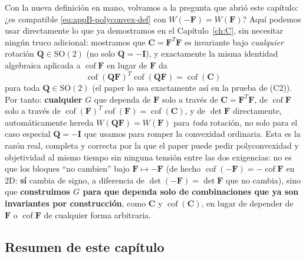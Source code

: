 \documentclass[11pt,a4paper]{article}
\newcommand{\Cof}{\operatorname{cof}}
\begin{document}
Con la nueva definici\'on en mano, volvamos a la pregunta que abri\'o
este cap\'itulo: ¿es compatible \eqref{eq:appB-polyconvex-def} con
$W(-\bm F)=W(\bm F)$? Aqu\'i podemos usar directamente lo que ya
demostramos en el Cap\'itulo~\ref{ch:C}, sin necesitar ning\'un truco
adicional: mostramos que $\bm C=\bm F^T\bm F$ es invariante bajo
\emph{cualquier} rotaci\'on $\bm Q\in\mathrm{SO}(2)$ (no solo
$\bm Q=-\bm I$), y exactamente la misma identidad algebraica aplicada a
$\Cof\bm F$ en lugar de $\bm F$ da
\begin{equation}
 \Cof(\bm Q\bm F)^T\Cof(\bm Q\bm F)=\Cof(\bm C)
 \label{eq:appB-cofC-invariance}
\end{equation}
para toda $\bm Q\in\mathrm{SO}(2)$ (el paper lo usa exactamente as\'i en
la prueba de (C2)). Por tanto: \textbf{cualquier} $G$ que dependa de
$\bm F$ solo a trav\'es de $\bm C=\bm F^T\bm F$, de $\Cof\bm F$ solo a
trav\'es de $\Cof(\bm F)^T\Cof(\bm F)=\Cof(\bm C)$, y de $\det\bm F$
directamente, autom\'aticamente hereda $W(\bm Q\bm F)=W(\bm F)$ para
\emph{toda} rotaci\'on, no solo para el caso especial
$\bm Q=-\bm I$ que usamos para romper la convexidad ordinaria. Esta es
la raz\'on real, completa y correcta por la que el paper puede pedir
polyconvexidad y objetividad al mismo tiempo sin ninguna tensi\'on
entre las dos exigencias: no es que los bloques ``no cambien'' bajo
$\bm F\mapsto-\bm F$ (de hecho $\Cof(-\bm F)=-\Cof\bm F$ en 2D:
\textbf{s\'i} cambia de signo, a diferencia de $\det(-\bm F)=\det\bm F$
que no cambia), sino que \textbf{construimos $G$ para que dependa solo
de combinaciones que ya son invariantes por construcci\'on}, como
$\bm C$ y $\Cof(\bm C)$, en lugar de depender de $\bm F$ o $\Cof\bm F$
de cualquier forma arbitraria.

\subsection{Resumen de este cap\'itulo}
\end{document}
